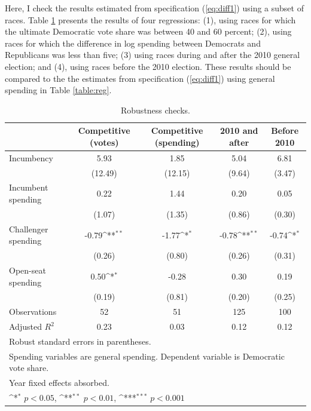 \documentclass{article}
\begin{document}
Here, I check the results estimated from specification (\ref{eq:diff1}) using a subset of races. Table \ref{table:robustness} presents the results of four regressions: (1), using races for which the ultimate Democratic vote share was between 40 and 60 percent; (2), using races for which the difference in log spending between Democrats and Republicans was less than five; (3) using races during and after the 2010 general election; and (4), using races before the 2010 election. These results should be compared to the the estimates from specification (\ref{eq:diff1}) using general spending in Table \ref{table:reg}.

\begin{table}
\centering
\def\sym#1{\ifmmode^{#1}\else\(^{#1}\)\fi}
\caption{Robustness checks. \label{table:robustness}}
\begin{tabular}{l*{4}{c}}
\toprule
                    &\multicolumn{1}{c}{Competitive (votes)}&\multicolumn{1}{c}{Competitive (spending)}&\multicolumn{1}{c}{2010 and after}&\multicolumn{1}{c}{Before 2010}\\
\midrule
Incumbency          &        5.93         &        1.85         &        5.04         &        6.81         \\
                    &     (12.49)         &     (12.15)         &      (9.64)         &      (3.47)         \\
\addlinespace
Incumbent spending  &        0.22         &        1.44         &        0.20         &        0.05         \\
                    &      (1.07)         &      (1.35)         &      (0.86)         &      (0.30)         \\
\addlinespace
Challenger spending &       -0.79\sym{**} &       -1.77\sym{*}  &       -0.78\sym{**} &       -0.74\sym{*}  \\
                    &      (0.26)         &      (0.80)         &      (0.26)         &      (0.31)         \\
\addlinespace
Open-seat spending  &        0.50\sym{*}  &       -0.28         &        0.30         &        0.19         \\
                    &      (0.19)         &      (0.81)         &      (0.20)         &      (0.25)         \\
\midrule
Observations        &          52         &          51         &         125         &         100         \\
Adjusted \(R^{2}\)  &        0.23         &        0.03         &        0.12         &        0.12         \\
\bottomrule
\multicolumn{5}{l}{\footnotesize Robust standard errors in parentheses.}\\
\multicolumn{5}{l}{\footnotesize Spending variables are general spending. Dependent variable is Democratic vote share.}\\
\multicolumn{5}{l}{\footnotesize  Year fixed effects absorbed.}\\
\multicolumn{5}{l}{\footnotesize \sym{*} \(p<0.05\), \sym{**} \(p<0.01\), \sym{***} \(p<0.001\)}\\
\end{tabular}
\end{table}
\end{document}
